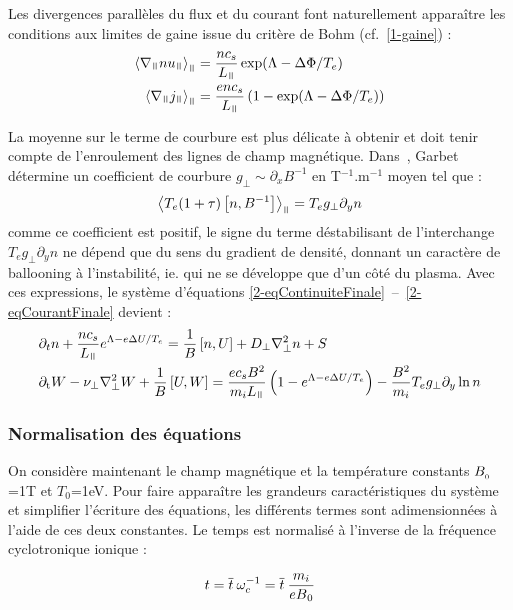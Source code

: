\begin{refsection}
Les divergences parallèles du flux et du
courant font naturellement apparaître
les conditions aux limites de gaine issue du critère de Bohm (cf.~\ref{1-gaine})
:
\begin{align}
\left<\nabla_\para
nu_\para\right>_\para&=\frac{nc_s}{L_\para}\exp(\Lambda-\Delta\Phi/T_e)
\\
\left<\nabla_\para
j_\para\right>_\para&=\frac{enc_s}{L_\para}\left(1-\exp(\Lambda-\Delta\Phi/T_e)\right)
\end{align}

La moyenne sur le terme de courbure est plus délicate à obtenir et doit tenir
compte de l'enroulement des lignes de champ magnétique. Dans~\parencite{Garbet},
Garbet détermine un coefficient de courbure
$g_\perp\sim\partial_xB^{-1}$ en T$^{-1}$.m$^{-1}$ moyen tel que :
\begin{equation}
\left<T_e(1+\tau)\left[n,B^{-1}\right]\right>_\para=T_eg_\perp\partial_yn
\end{equation}
comme ce coefficient est positif, le signe du terme déstabilisant
de l'interchange $T_eg_\perp\partial_yn$ ne dépend que du sens du gradient de
densité, donnant un caractère de ballooning à l'instabilité, ie. qui ne se développe que
d'un côté du plasma. Avec ces expressions, le système d'équations
\eqref{2-eqContinuiteFinale}~--~\eqref{2-eqCourantFinale} devient :
\begin{align}
\label{2-eqContinuiteMoyenne}
&\partial_t n + \frac{nc_s}{L_\para}e^{\Lambda-e\Delta U/T_e} =
\frac{1}{B}\left[n,U\right] + D_\perp\nabla^2_\perp n + S\\
&\partial_\text{t}W - \nu_\perp
\nabla_\perp^2W+
\frac{1}{B}\left[U,W\right]=\frac{ec_sB^2}{m_iL_\para}\left(1-e^{\Lambda-e\Delta
U/T_e}\right) -\frac{B^2}{m_i}T_eg_\perp\partial_y\ln n
\label{2-eqCourantMoyenne}
\end{align}
 
\subsubsection{Normalisation des équations}

On considère maintenant le champ magnétique et la température constants 
$B_{{_{0}}}$=1T et $T_0$=1eV.
Pour faire apparaître les grandeurs caractéristiques du système et simplifier
l'écriture des équations, les différents termes sont adimensionnées à
l'aide de ces deux constantes. Le temps est normalisé à l'inverse de la
fréquence cyclotronique ionique :

\begin{equation}
t = \overline{t}\:\omega_c^{{-1}} =
\overline{t}\:\frac{m_i}{eB{_{0}}}
\end{equation}


\end{refsection}
